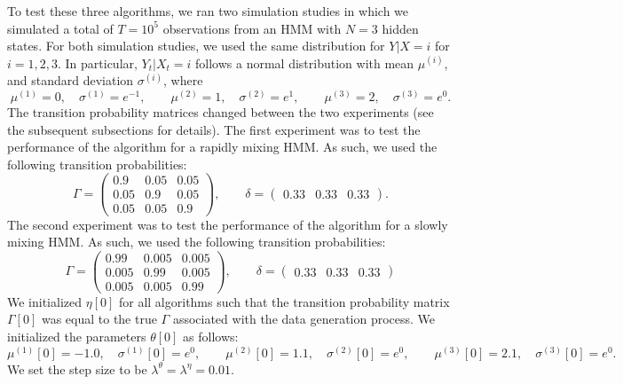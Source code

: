To test these three algorithms, we ran two simulation studies in which we simulated a total of $T = 10^{5}$ observations from an HMM with $N = 3$ hidden states. For both simulation studies, we used the same distribution for $Y | X = i$ for $i = 1,2,3$. In particular, $Y_t | X_t = i$ follows a normal distribution with mean $\mu^{(i)}$, and standard deviation $\sigma^{(i)}$, where
%
\begin{equation*}
    \mu^{(1)} = 0, \quad \sigma^{(1)} = e^{-1}, \qquad
    \mu^{(2)} = 1, \quad \sigma^{(2)} = e^{1}, \qquad
    \mu^{(3)} = 2, \quad \sigma^{(3)} = e^{0}.
\end{equation*}
%
The transition probability matrices changed between the two experiments (see the subsequent subsections for details). The first experiment was to test the performance of the algorithm for a rapidly mixing HMM. As such, we used the following transition probabilities:
%
\begin{equation*}
    \Gamma = 
    \begin{pmatrix} 
        0.9 & 0.05 & 0.05 \\
        0.05 & 0.9 & 0.05 \\
        0.05 & 0.05 & 0.9
    \end{pmatrix},
    \qquad
    \delta = \begin{pmatrix} 0.33 & 0.33 & 0.33 \end{pmatrix}.
\end{equation*}
%
The second experiment was to test the performance of the algorithm for a slowly mixing HMM. As such, we used the following transition probabilities:
%
\begin{equation*}
    \Gamma = 
    \begin{pmatrix} 
        0.99 & 0.005 & 0.005 \\
        0.005 & 0.99 & 0.005 \\
        0.005 & 0.005 & 0.99
    \end{pmatrix},
    \qquad
    \delta = \begin{pmatrix} 0.33 & 0.33 & 0.33 \end{pmatrix}
\end{equation*}
%
We initialized $\eta[0]$ for all algorithms such that the transition probability matrix $\Gamma[0]$ was equal to the true $\Gamma$ associated with the data generation process. We initialized the parameters $\theta[0]$ as follows:
%
\begin{equation*}
    \mu^{(1)}[0] = -1.0, \quad \sigma^{(1)}[0] = e^{0}, \qquad
    \mu^{(2)}[0] = 1.1, \quad \sigma^{(2)}[0] = e^{0}, \qquad
    \mu^{(3)}[0] = 2.1, \quad \sigma^{(3)}[0] = e^{0}.
\end{equation*}
%
We set the step size to be $\lambda^\theta = \lambda^\eta = 0.01$. 

